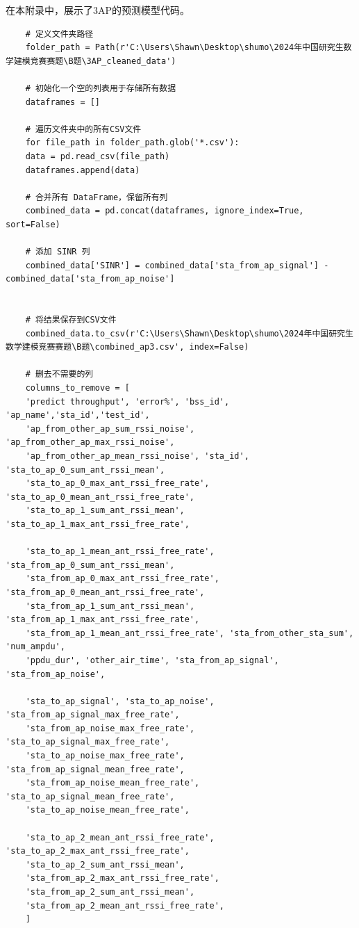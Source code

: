 \documentclass[bwprint]{gmcmthesis}
\begin{document}
\noindent 在本附录中，展示了3AP的预测模型代码。

\begin{lstlisting}
	# 定义文件夹路径
	folder_path = Path(r'C:\Users\Shawn\Desktop\shumo\2024年中国研究生数学建模竞赛赛题\B题\3AP_cleaned_data')
	
	# 初始化一个空的列表用于存储所有数据
	dataframes = []
	
	# 遍历文件夹中的所有CSV文件
	for file_path in folder_path.glob('*.csv'):
	data = pd.read_csv(file_path)
	dataframes.append(data)
	
	# 合并所有 DataFrame，保留所有列
	combined_data = pd.concat(dataframes, ignore_index=True, sort=False)
	
	# 添加 SINR 列
	combined_data['SINR'] = combined_data['sta_from_ap_signal'] - combined_data['sta_from_ap_noise']
	
	
	# 将结果保存到CSV文件
	combined_data.to_csv(r'C:\Users\Shawn\Desktop\shumo\2024年中国研究生数学建模竞赛赛题\B题\combined_ap3.csv', index=False)
	
	# 删去不需要的列
	columns_to_remove = [
	'predict throughput', 'error%', 'bss_id', 'ap_name','sta_id','test_id',
	'ap_from_other_ap_sum_rssi_noise', 'ap_from_other_ap_max_rssi_noise',
	'ap_from_other_ap_mean_rssi_noise', 'sta_id', 'sta_to_ap_0_sum_ant_rssi_mean',
	'sta_to_ap_0_max_ant_rssi_free_rate', 'sta_to_ap_0_mean_ant_rssi_free_rate',
	'sta_to_ap_1_sum_ant_rssi_mean', 'sta_to_ap_1_max_ant_rssi_free_rate',
	
	'sta_to_ap_1_mean_ant_rssi_free_rate', 'sta_from_ap_0_sum_ant_rssi_mean',
	'sta_from_ap_0_max_ant_rssi_free_rate', 'sta_from_ap_0_mean_ant_rssi_free_rate',
	'sta_from_ap_1_sum_ant_rssi_mean', 'sta_from_ap_1_max_ant_rssi_free_rate',
	'sta_from_ap_1_mean_ant_rssi_free_rate', 'sta_from_other_sta_sum', 'num_ampdu',
	'ppdu_dur', 'other_air_time', 'sta_from_ap_signal', 'sta_from_ap_noise',
	
	'sta_to_ap_signal', 'sta_to_ap_noise', 'sta_from_ap_signal_max_free_rate',
	'sta_from_ap_noise_max_free_rate', 'sta_to_ap_signal_max_free_rate',
	'sta_to_ap_noise_max_free_rate', 'sta_from_ap_signal_mean_free_rate',
	'sta_from_ap_noise_mean_free_rate', 'sta_to_ap_signal_mean_free_rate',
	'sta_to_ap_noise_mean_free_rate',
	
	'sta_to_ap_2_mean_ant_rssi_free_rate', 'sta_to_ap_2_max_ant_rssi_free_rate',
	'sta_to_ap_2_sum_ant_rssi_mean',           
	'sta_from_ap_2_max_ant_rssi_free_rate',    
	'sta_from_ap_2_sum_ant_rssi_mean',         
	'sta_from_ap_2_mean_ant_rssi_free_rate',
	]
	

\end{lstlisting}
\end{document}

